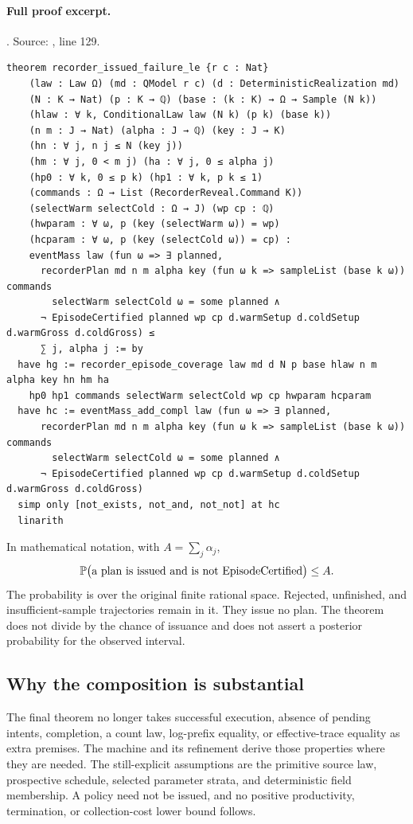 \documentclass[11pt]{article}
\begin{document}
\paragraph{Full proof excerpt.}. Source: , line 129.
\begin{lstlisting}[style=AVOCSource]
theorem recorder_issued_failure_le {r c : Nat}
    (law : Law Ω) (md : QModel r c) (d : DeterministicRealization md)
    (N : K → Nat) (p : K → ℚ) (base : (k : K) → Ω → Sample (N k))
    (hlaw : ∀ k, ConditionalLaw law (N k) (p k) (base k))
    (n m : J → Nat) (alpha : J → ℚ) (key : J → K)
    (hn : ∀ j, n j ≤ N (key j))
    (hm : ∀ j, 0 < m j) (ha : ∀ j, 0 ≤ alpha j)
    (hp0 : ∀ k, 0 ≤ p k) (hp1 : ∀ k, p k ≤ 1)
    (commands : Ω → List (RecorderReveal.Command K))
    (selectWarm selectCold : Ω → J) (wp cp : ℚ)
    (hwparam : ∀ ω, p (key (selectWarm ω)) = wp)
    (hcparam : ∀ ω, p (key (selectCold ω)) = cp) :
    eventMass law (fun ω => ∃ planned,
      recorderPlan md n m alpha key (fun ω k => sampleList (base k ω)) commands
        selectWarm selectCold ω = some planned ∧
      ¬ EpisodeCertified planned wp cp d.warmSetup d.coldSetup d.warmGross d.coldGross) ≤
      ∑ j, alpha j := by
  have hg := recorder_episode_coverage law md d N p base hlaw n m alpha key hn hm ha
    hp0 hp1 commands selectWarm selectCold wp cp hwparam hcparam
  have hc := eventMass_add_compl law (fun ω => ∃ planned,
      recorderPlan md n m alpha key (fun ω k => sampleList (base k ω)) commands
        selectWarm selectCold ω = some planned ∧
      ¬ EpisodeCertified planned wp cp d.warmSetup d.coldSetup d.warmGross d.coldGross)
  simp only [not_exists, not_and, not_not] at hc
  linarith
\end{lstlisting}


In mathematical notation, with $A=\sum_j\alpha_j$,
\[
 \mathbb P\bigl(\text{a plan is issued and is not EpisodeCertified}\bigr)\le A.
\]
The probability is over the original finite rational space. Rejected,
unfinished, and insufficient-sample trajectories remain in it. They issue no
plan. The theorem does not divide by the chance of issuance and does not
assert a posterior probability for the observed interval.

\subsection{Why the composition is substantial}
The final theorem no longer takes successful execution, absence of pending
intents, completion, a count law, log-prefix equality, or effective-trace
equality as extra premises. The machine and its refinement derive those
properties where they are needed. The still-explicit assumptions are the
primitive source law, prospective schedule, selected parameter strata, and
deterministic field membership. A policy need not be issued, and no positive
productivity, termination, or collection-cost lower bound follows.
\end{document}
